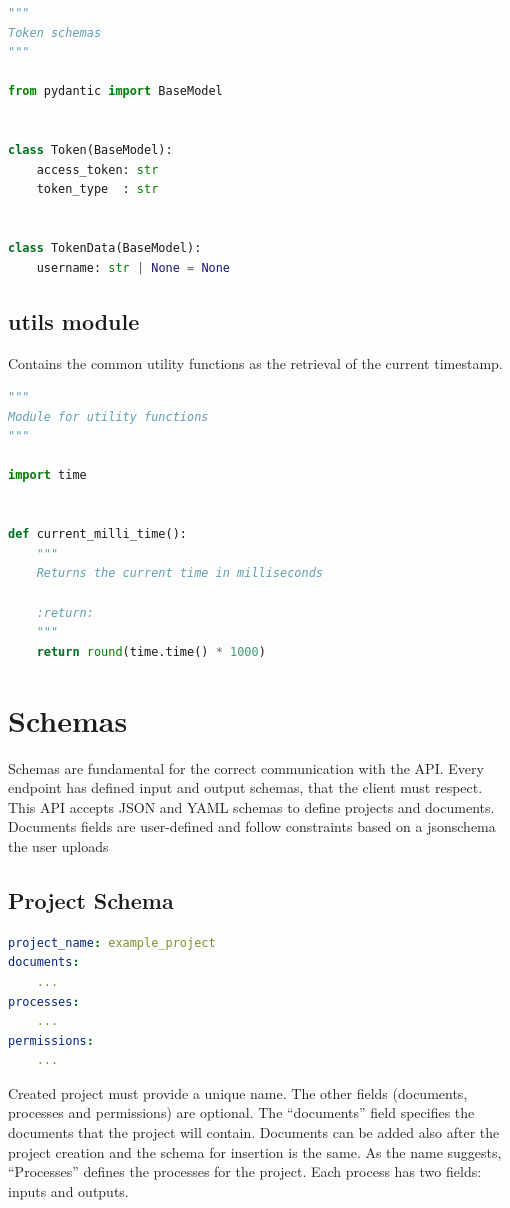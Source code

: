 \documentclass[12pt]{report}
\begin{document}
\begin{lstlisting}[language=Python, caption=Token Schemas]
"""
Token schemas
"""

from pydantic import BaseModel


class Token(BaseModel):
    access_token: str
    token_type  : str


class TokenData(BaseModel):
    username: str | None = None
\end{lstlisting}

\subsection{utils module}
Contains the common utility functions as the retrieval of the current timestamp.

\begin{lstlisting}[language=Python, caption=Utility functions]
"""
Module for utility functions
"""

import time


def current_milli_time():
    """
    Returns the current time in milliseconds

    :return:
    """
    return round(time.time() * 1000)

\end{lstlisting}

\section{Schemas}

Schemas are fundamental for the correct communication with the API. Every endpoint has defined input and output schemas, that the client must respect.
This API accepts JSON and YAML schemas to define projects and documents. Documents fields are user-defined and follow constraints based on a jsonschema the user uploads

\subsection{Project Schema}

\begin{lstlisting}[language=yaml, caption=Project creation schema]
project_name: example_project
documents:
	...
processes:
	...
permissions:
	...
\end{lstlisting}

Created project must provide a unique name. The other fields (documents, processes and permissions) are optional.
The “documents” field specifies the documents that the project will contain. 
Documents can be added also after the project creation and the schema for insertion is the same.
As the name suggests, “Processes” defines the processes for the project. Each process has two fields: inputs and outputs.
\end{document}
